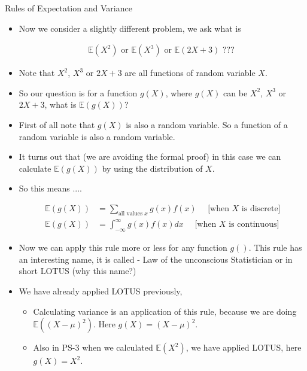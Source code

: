 \documentclass[8pt, usepdftitle=false]{beamer}
\begin{document}
\begin{frame}[allowframebreaks]{Rules of Expectation and Variance}
\begin{itemize}
\item Now we consider a slightly different problem, we ask what is 

{\huge{
\vspace*{-.5cm}
\begin{align*}
\mathbb{E}(X^2) \text{ or } \mathbb{E}(X^3)  \text{ or } \mathbb{E}(2X + 3) \text{ ??? }
\end{align*}
}}

\item Note that $X^2$, $X^3$ or $2X + 3$ are all functions of random variable $X$. 

\item So our question is for a function $g(X)$, where $g(X)$ can be $X^2$, $X^3$ or $2X + 3$, what is $\mathbb{E}(g(X))$?

\item First of all note that $g(X)$ is also a random variable. So a function of a random variable is also a random variable.

\item It turns out that (we are avoiding the formal proof) in this case we can calculate $\mathbb{E}(g(X))$ by using the distribution of $X$. 

\item So this means ....

\begin{align*}
\mathbb{E}(g(X)) &= \sum_{\text {all values } x} g(x) f(x) \quad \text{ [when $X$ is discrete]}\\
\mathbb{E}(g(X)) &=\int_{-\infty}^{\infty} g(x) f(x) d x \quad \text{ [when $X$ is continuous]} 
\end{align*}

\item Now we can apply this rule more or less for any function $g()$. This rule has an interesting name, it is called - \alert{Law of the unconscious Statistician} or in short \alert{LOTUS} (why this name?)

\item We have already applied LOTUS previously,

\begin{itemize}
\item Calculating variance is an application of this rule, because we are doing $\mathbb{E}\left( \left( X - \mu  \right)^2  \right)$. Here $g(X) =  \left( X - \mu  \right)^2 $.

\item Also in PS-3 when we calculated $\mathbb{E}\left( X^2  \right)$, we have applied LOTUS, here $g(X) = X^2$.


\end{itemize}
\end{itemize}
\end{frame}
\end{document}
